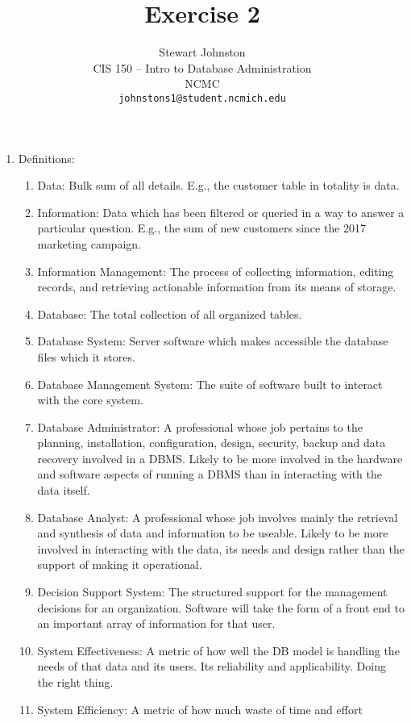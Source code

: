 \documentclass{article}
\title{Exercise 2}
\author{Stewart Johnston\\
  {CIS 150 -- Intro to Database Administration}\\
  {NCMC}\\
  {\texttt{johnstons1@student.ncmich.edu}}
}
\date
\begin{document}
\maketitle

\begin{enumerate}

	\item Definitions:

\begin{enumerate}
	
	\item Data: Bulk sum of all details. E.g., the customer table in totality is data.
	\item Information: Data which has been filtered or queried in a way to
		answer a particular question. E.g., the sum of new customers
		since the 2017 marketing campaign.
	\item Information Management: The process of collecting information,
		editing records, and retrieving actionable information from
		its means of storage. 
	\item Database: The total collection of all organized tables.
	\item Database System: Server software which makes accessible the
		database files which it stores.
	\item Database Management System: The suite of software built to
		interact with the core system.
	\item Database Administrator: A professional whose job pertains to the
		planning, installation, configuration, design, security, backup
		and data recovery involved in a DBMS. Likely to be more
		involved in the hardware and software aspects of running a DBMS
		than in interacting with the data itself.
	\item Database Analyst: A professional whose job involves mainly the
		retrieval and synthesis of data and information to be useable.
		Likely to be more involved in interacting with the data, its
		needs and design rather than the support of making it
		operational.
	\item Decision Support System: The structured support for the
		management decisions for an organization. Software will take
		the form of a front end to an important array of information
		for that user.
	\item System Effectiveness: A metric of how well the DB model is
		handling the needs of that data and its users. Its reliability
		and applicability. Doing the right thing.
	\item System Efficiency: A metric of how much waste of time and effort

\end{enumerate}
\end{enumerate}
\end{document}
